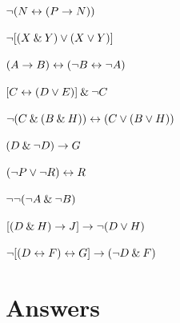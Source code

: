 \begin{earg}

\item ${\neg} (N \leftrightarrow (P \rightarrow N))$

\item ${\neg} [(X \mathbin{\&} Y) \vee (X \vee Y)]$

\item $(A \rightarrow B) \leftrightarrow ({\neg} B\leftrightarrow {\neg} A)$

\item $[C \leftrightarrow (D \vee E)] \mathbin{\&} {\neg} C$

\item ${\neg}(C \mathbin{\&} (B \mathbin{\&} H)) \leftrightarrow (C \vee (B \vee H))$

\item	$(D \mathbin{\&} {\neg} D) \rightarrow G $

\item	$({\neg} P \vee {\neg} R) \leftrightarrow R $

\item	${\neg} {\neg} ({\neg} A \mathbin{\&} {\neg} B)  $

\item 	$[(D \mathbin{\&} H) \rightarrow J] \rightarrow {\neg}(D \vee H) $

\item	${\neg} [(D \leftrightarrow F) \leftrightarrow G] \rightarrow ({\neg} D \mathbin{\&} F) $

\end{earg}





\section{Answers}
\setcounter{ProbPart}{0}

\problempart\label{pr.TT.TTorC-a}

